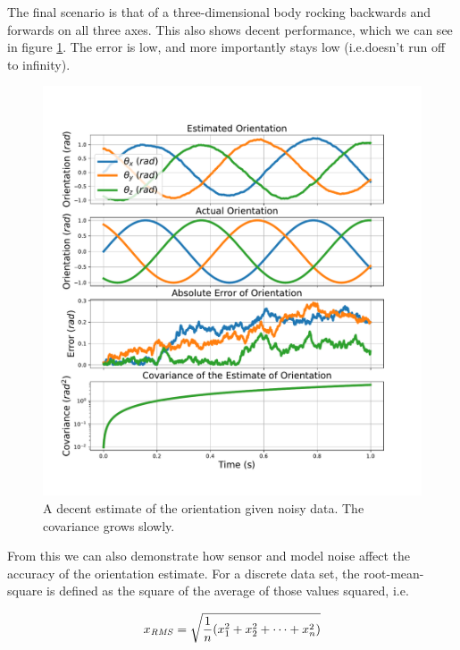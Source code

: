 \documentclass[12pt]{article}
\begin{document}
The final scenario is that of a three-dimensional body rocking backwards and forwards on all three axes. This also shows decent performance, which we can see in figure \ref{3d_orient_fig}. The error is low, and more importantly stays low (i.e.\@ doesn't run off to infinity).

\begin{figure}[thp]
	\centering
	
	\includegraphics[width=\textwidth]{3d-orientation.pdf}
	
	\caption{A decent estimate of the orientation given noisy data. The covariance grows slowly.}
	\label{3d_orient_fig}
\end{figure}

From this we can also demonstrate how sensor and model noise affect the accuracy of the orientation estimate. For a discrete data set, the root-mean-square is defined as the square of the average of those values squared, i.e.

\newcommand{\RMS}{\ensuremath{\mathit{RMS}}} %
\begin{equation}
	x_\RMS = \sqrt{{1 \over n}(x_1^2 + x_2^2 + \dots + x_n^2)}
\end{equation}
\end{document}
